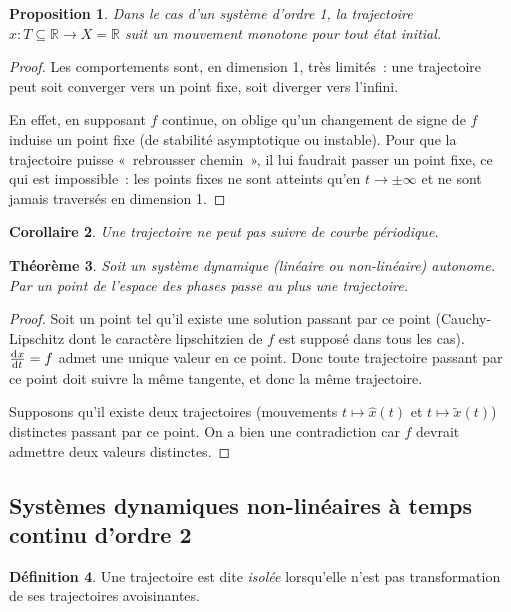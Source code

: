 \documentclass{article}
\newtheorem{thm}{Théorème}[section]
\newtheorem{prp}[thm]{Proposition}
\newtheorem{cor}[thm]{Corollaire}
\theoremstyle{definition}
\newtheorem{déf}[thm]{Définition}
\theoremstyle{remark}
\newcommand{\R}{\mathbb R}
\begin{document}
	\begin{prp} Dans le cas d'un système d'ordre 1, la trajectoire $x : T \subseteq \R \to X = \R$ suit un mouvement monotone pour tout état initial.
	\end{prp}

	\begin{proof} Les comportements sont, en dimension 1, très limités~: une trajectoire peut soit converger vers un point fixe, soit diverger vers l'infini.

	En effet, en supposant $f$ continue, on oblige qu'un changement de signe de $f$ induise un point fixe (de stabilité asymptotique ou instable). Pour que la
	trajectoire puisse «~rebrousser chemin~», il lui faudrait passer un point fixe, ce qui est impossible~: les points fixes ne sont atteints qu'en $t \to \pm \infty$
	et ne sont jamais traversés en dimension 1.
	\end{proof}

	\begin{cor} Une trajectoire ne peut pas suivre de courbe périodique.
	\end{cor}

	\begin{thm} Soit un système dynamique (linéaire ou non-linéaire) autonome. Par un point de l'espace des phases passe au plus une trajectoire.
	\end{thm}

	\begin{proof} Soit un point tel qu'il existe une solution passant par ce point (Cauchy-Lipschitz dont le caractère lipschitzien de $f$ est supposé dans tous
	les cas). $\od xt = f$ admet une unique valeur en ce point. Donc toute trajectoire passant par ce point doit suivre la même tangente, et donc la même trajectoire.

	Supposons qu'il existe deux trajectoires (mouvements $t \mapsto \hat x(t)$ et $t \mapsto \tilde x(t)$) distinctes passant par ce point. On a bien une
	contradiction car $f$ devrait admettre deux valeurs distinctes.
	\end{proof}

	\subsection{Systèmes dynamiques non-linéaires à temps continu d'ordre 2}

	\begin{déf} Une trajectoire est dite \textit{isolée} lorsqu'elle n'est pas transformation de ses trajectoires avoisinantes.
	\end{déf}
\end{document}
